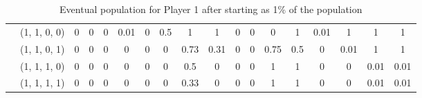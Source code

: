 \begin{table}
{\begin{tabular}{c r| c|c|c|c|c|c|c|c|c|c|c|c|c|c|c|c|}
&(1, 1, 0, 0) & 0 & 0 & 0 & 0.01 & 0 & 0.5 & 1 & 1 & 0 & 0 & 0 & 1 & 0.01 & 1 & 1 & 1 \\ \cline{3-18}
&(1, 1, 0, 1) & 0 & 0 & 0 & 0 & 0 & 0 & 0.73 & 0.31 & 0 & 0 & 0.75 & 0.5 & 0 & 0.01 & 1 & 1 \\ \cline{3-18}
&(1, 1, 1, 0) & 0 & 0 & 0 & 0 & 0 & 0 & 0.5 & 0 & 0 & 0 & 1 & 1 & 0 & 0 & 0.01 & 0.01 \\ \cline{3-18}
&(1, 1, 1, 1) & 0 & 0 & 0 & 0 & 0 & 0 & 0.33 & 0 & 0 & 0 & 1 & 1 & 0 & 0 & 0.01 & 0.01 \\ \cline{3-18}
\end{tabular}%
}\caption{Eventual population for Player 1 after starting as 1\% of the population}\label{tab:insurgency_outcomes}
\end{table}
